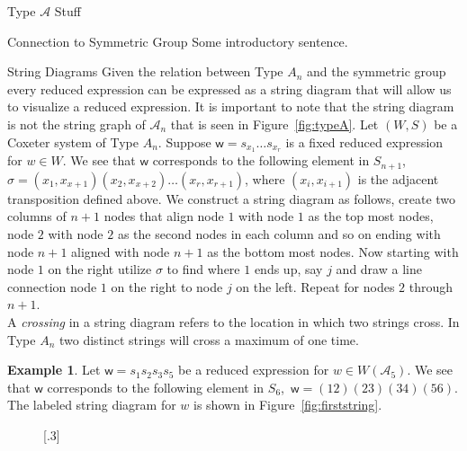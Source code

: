 \documentclass[11pt]{amsart}
\theoremstyle{definition}
\newtheorem{example}[theorem]{Example}
\numberwithin{equation}{section}
\newcommand{\A}{\mathcal{A}}
\renewcommand{\(}{\left(}
\renewcommand{\)}{\right)}
\newcommand{\w}{\mathsf{w}}
\begin{document}
\begin{section}{Type $\A$ Stuff}

\begin{subsection}{Connection to Symmetric Group}
Some introductory sentence.  
\end{subsection}

\begin{subsection}{String Diagrams}
Given the relation between Type $A_n$ and the symmetric group every reduced expression can be expressed as a string diagram that will allow us to visualize a reduced expression. It is important to note that the string diagram is not the string graph of $\A_n$ that is seen in Figure~\ref{fig:typeA}. Let $(W,S)$ be a Coxeter system of Type $A_n$. Suppose $\w=s_{x_1} \ldots s_{x_r}$ is a fixed reduced expression for $w \in W$. We see that $\w$ corresponds to the following element in $S_{n+1}$, $\sigma=(x_1,x_{x+1})(x_2,x_{x+2}) \ldots (x_r,x_{r+1})$, where $(x_i,x_{i+1})$ is the adjacent transposition defined above. We construct a string diagram as follows, create two columns of $n+1$ nodes that align node $1$ with node $1$ as the top most nodes, node $2$ with node $2$ as the second nodes in each column and so on ending with node $n+1$ aligned with node $n+1$ as the bottom most nodes. Now starting with node $1$ on the right utilize $\sigma$ to find where $1$ ends up, say $j$ and draw a line connection node $1$ on the right to node $j$ on the left. Repeat for nodes $2$ through $n+1$. \\
A \emph{crossing} in a string diagram refers to the location in which two strings cross. In Type $A_n$ two distinct strings will cross a maximum of one time. 
\begin{example}\label{ex:first string}
Let $\w=s_1 s_2 s_3 s_5$ be a reduced expression for $w \in W(\A_5)$. We see that $\w$ corresponds to the following element in $S_6$,~$\w=(12)(23)(34)(56)$. The labeled string diagram for $w$ is shown in Figure~\ref{fig:firststring}.\\	
\begin{figure}[!ht]
\subcaptionbox{\label{fig:firststring}}[.3\textwidth]{
}
\end{figure}
\end{example}
\end{subsection}
\end{section}
\end{document}

